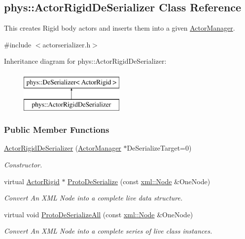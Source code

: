 \hypertarget{classphys_1_1ActorRigidDeSerializer}{
\subsection{phys::ActorRigidDeSerializer Class Reference}
\label{classphys_1_1ActorRigidDeSerializer}
}


This creates Rigid body actors and inserts them into a given \hyperlink{classphys_1_1ActorManager}{ActorManager}.  




{\ttfamily \#include $<$actorserializer.h$>$}

Inheritance diagram for phys::ActorRigidDeSerializer:\begin{figure}[H]
\begin{center}
\leavevmode
\includegraphics[height=2.000000cm]{classphys_1_1ActorRigidDeSerializer}
\end{center}
\end{figure}
\subsubsection*{Public Member Functions}
\begin{DoxyCompactItemize}
\item 
\hyperlink{classphys_1_1ActorRigidDeSerializer_afee94113d3b5579b47f42fb8b3fb28b7}{ActorRigidDeSerializer} (\hyperlink{classphys_1_1ActorManager}{ActorManager} $\ast$DeSerializeTarget=0)
\begin{DoxyCompactList}\small\item\em Constructor. \item\end{DoxyCompactList}\item 
virtual \hyperlink{classphys_1_1ActorRigid}{ActorRigid} $\ast$ \hyperlink{classphys_1_1ActorRigidDeSerializer_a686dcb42f7776cd4bd41f6573d0601b7}{ProtoDeSerialize} (const \hyperlink{classphys_1_1xml_1_1Node}{xml::Node} \&OneNode)
\begin{DoxyCompactList}\small\item\em Convert An XML Node into a complete live data structure. \item\end{DoxyCompactList}\item 
virtual void \hyperlink{classphys_1_1ActorRigidDeSerializer_a63f7309025f18e8c7ca49f1bda7f8853}{ProtoDeSerializeAll} (const \hyperlink{classphys_1_1xml_1_1Node}{xml::Node} \&OneNode)
\begin{DoxyCompactList}\small\item\em Convert An XML Node into a complete series of live class instances. \item\end{DoxyCompactList}\end{DoxyCompactItemize}


